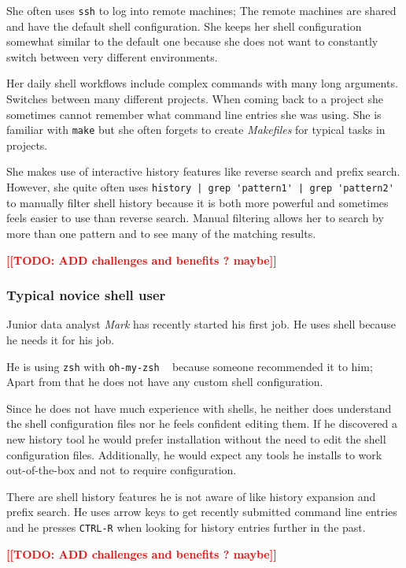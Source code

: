 \documentclass[thesis=M,english]{FITthesis}[2012/10/20]
\newcommand{\todotext}[1]{\textcolor{red}{\textbf{[[#1]]}}}
\let\myCite\cite
\renewcommand\cite{\unskip~\myCite}
\begin{document}
She often uses \verb|ssh| to log into remote machines; The remote machines are shared and have the default shell configuration. She keeps her shell configuration somewhat similar to the default one because she does not want to constantly switch between very different environments. 

Her daily shell workflows include complex commands with many long arguments. Switches between many different projects. When coming back to a project she sometimes cannot remember what command line entries she was using. She is familiar with \verb|make| but she often forgets to create \textit{Makefiles} for typical tasks in projects.

She makes use of interactive history features like reverse search and prefix search. However, she quite often uses \verb#history | grep 'pattern1' | grep 'pattern2'# to manually filter shell history because it is both more powerful and sometimes feels easier to use than reverse search. Manual filtering allows her to search by more than one pattern and to see many of the matching results. 


\todotext{TODO: ADD challenges and benefits ? maybe}

\subsubsection*{Typical novice shell user}

Junior data analyst \textit{Mark} has recently started his first job. He uses shell because he needs it for his job. 

He is using \verb|zsh| with \verb|oh-my-zsh| \cite{toolsohmyzsh} because someone recommended it to him; Apart from that he does not have any custom shell configuration. 

Since he does not have much experience with shells, he neither does understand the shell configuration files nor he feels confident editing them. If he discovered a new history tool he would prefer installation without the need to edit the shell configuration files. Additionally, he would expect any tools he installs to work out-of-the-box and not to require configuration. 

There are shell history features he is not aware of like history expansion and prefix search. He uses arrow keys to get recently submitted command line entries and he presses \verb|CTRL-R| when looking for history entries further in the past. 

\todotext{TODO: ADD challenges and benefits ? maybe}
\end{document}
